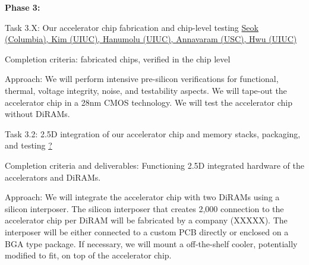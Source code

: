\noindent
\textbf{Phase 3:}

Task 3.X: Our accelerator chip fabrication and chip-level testing \underline{Seok (Columbia), Kim (UIUC), Hanumolu (UIUC), Annavaram (USC), Hwu (UIUC)}

   Completion criteria: fabricated chips, verified in the chip level

   Approach: We will perform intensive pre-silicon verifications for functional, thermal, voltage integrity, noise, and testability aspects. We will tape-out the accelerator chip in a 28nm CMOS technology. We will test the accelerator chip without DiRAMs. 

Task 3.2: 2.5D integration of our accelerator chip and memory stacks, packaging, and testing \underline{?}

   Completion criteria and deliverables: Functioning 2.5D integrated hardware of the accelerators and DiRAMs. 

   Approach:  We will integrate the accelerator chip with two DiRAMs using a silicon interposer. The silicon interposer that creates 2,000 connection to the accelerator chip per DiRAM will be fabricated by a company (XXXXX). The interposer will be either connected to a custom PCB directly or enclosed on a BGA type package. If necessary, we will mount a off-the-shelf cooler, potentially modified to fit, on top of the accelerator chip. 
